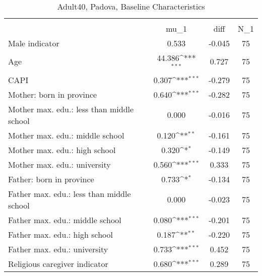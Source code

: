 \begin{table}[htbp]\centering
\def\sym#1{\ifmmode^{#1}\else\(^{#1}\)\fi}
\caption{Adult40, Padova, Baseline Characteristics}
\begin{tabular}{l*{1}{ccc}}
\toprule
                    &\multicolumn{3}{c}{}                           \\
                    &        mu\_1         &        diff&         N\_1\\
\midrule
Male indicator      &       0.533         &      -0.045&          75\\
Age                 &      44.386\sym{***}&       0.727&          75\\
CAPI                &       0.307\sym{***}&      -0.279&          75\\
Mother: born in province&       0.640\sym{***}&      -0.282&          75\\
Mother max. edu.: less than middle school&       0.000         &      -0.016&          75\\
Mother max. edu.: middle school&       0.120\sym{**} &      -0.161&          75\\
Mother max. edu.: high school&       0.320\sym{*}  &      -0.149&          75\\
Mother max. edu.: university&       0.560\sym{***}&       0.333&          75\\
Father: born in province&       0.733\sym{*}  &      -0.134&          75\\
Father max. edu.: less than middle school&       0.000         &      -0.023&          75\\
Father max. edu.: middle school&       0.080\sym{***}&      -0.201&          75\\
Father max. edu.: high school&       0.187\sym{**} &      -0.220&          75\\
Father max. edu.: university&       0.733\sym{***}&       0.452&          75\\
Religious caregiver indicator&       0.680\sym{***}&       0.289&          75\\
\bottomrule
\end{tabular}
\end{table}
